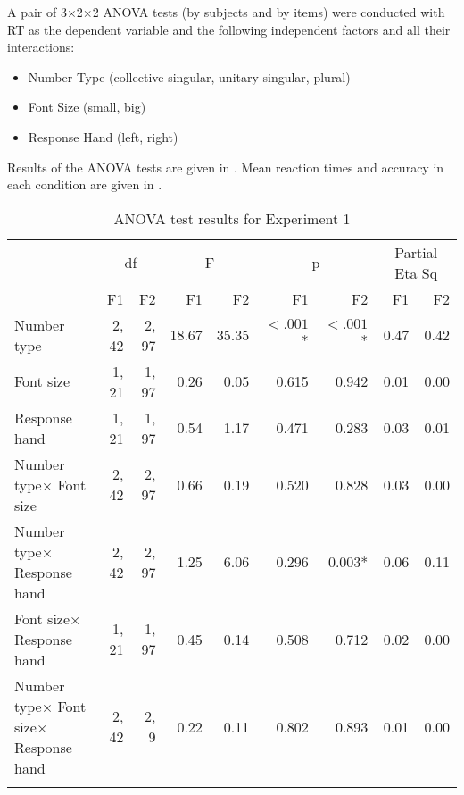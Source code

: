 \documentclass[output=paper]{langscibook}
\begin{document}
A pair of 3×2×2 ANOVA tests (by subjects and by items) were conducted with RT as the dependent variable and the following independent factors and all their interactions:

\begin{itemize}
\item Number Type (collective singular, unitary singular, plural)
\item Font Size (small, big) 
\item Response Hand (left, right)
\end{itemize}

Results of the ANOVA tests are given in . Mean reaction times and accuracy in each condition are given in .


\begin{table}
\caption{ANOVA test results for Experiment 1}
\label{gul-bla:tab:ANOVA-exp1}
\begin{tabularx}{\textwidth}{X r@{~~}r r@{~~}r r@{~~}r r@{}r}
\lsptoprule
\multirow{2}{*}{Source}  & \multicolumn{2}{c}{df} & \multicolumn{2}{c}{F} & \multicolumn{2}{c}{p}               & \multicolumn{2}{c}{Partial Eta Sq} \\
\cmidrule(lr){2-3}\cmidrule(lr){4-5}\cmidrule(lr){6-7}\cmidrule(lr){8-9}
                 & F1      & F2    & F1     & F2    & F1       & F2     & F1      & F2    \\
\midrule
Number type     &  2, 42   &  2, 97&  18.67 &  35.35&  $<.001$\parbox{0mm}{*}  &  $<.001$\parbox{0mm}{*}&  0.47   &  0.42  \\
\tablevspace
Font size       &  1, 21   &  1, 97&  0.26  &  0.05 &  0.615   &  0.942  &  0.01   &  0.00  \\
\tablevspace
Response hand   &  1, 21   &  1, 97&  0.54  &  1.17 &  0.471   &  0.283  &  0.03   &  0.01  \\
\tablevspace
Number type× \newline
Font size       &  2, 42   &  2, 97&  0.66  &  0.19 &  0.520   &  0.828  &  0.03   &  0.00  \\
\tablevspace
Number type× \newline
Response hand   &  2, 42   &  2, 97&  1.25  &  6.06 &  0.296   &  0.003\parbox{0mm}{*} &  0.06   &  0.11  \\
\tablevspace
Font size× \newline
Response hand   &  1, 21   &  1, 97&  0.45  &  0.14 &  0.508   &  0.712  &  0.02   &  0.00  \\
\tablevspace
Number type× \newline
Font size× \newline
Response hand    &  2, 42   &  2, 9 &  0.22  &  0.11 &  0.802   &  0.893  &  0.01   &  0.00  \\
\lspbottomrule
\end{tabularx}
\end{table}
\end{document}
